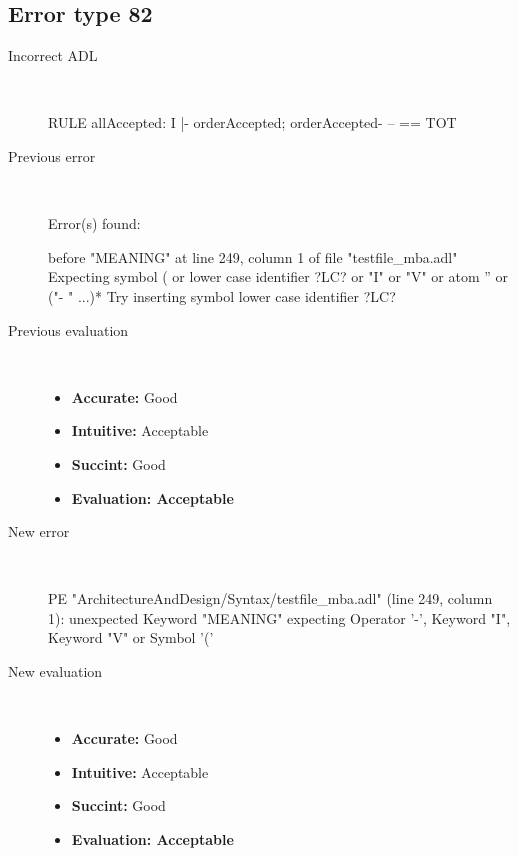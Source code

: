 \subsection{Error type 82}
  \begin{description}
  \item[Incorrect ADL]~\\
\begin{adl}
RULE allAccepted: I |- orderAccepted; orderAccepted- -- == TOT\end{adl}
  \item[Previous error]~\\
\begin{haskell}
Error(s) found:

before "MEANING" at line 249, column 1 of file "testfile_mba.adl"
Expecting symbol ( or lower case identifier ?LC? or "I" or "V" or atom '' or ("-
" ...)*
Try inserting symbol lower case identifier ?LC?
\end{haskell}
  \item[Previous evaluation]~\\
    \begin{itemize}
    \item \textbf{Accurate:} Good
    \item \textbf{Intuitive:} Acceptable
    \item \textbf{Succint:} Good
    \item \textbf{Evaluation: Acceptable}
    \end{itemize}
  \item[New error]~\\
\begin{haskell}
PE "ArchitectureAndDesign/Syntax/testfile_mba.adl" (line 249, column 1):
unexpected Keyword "MEANING"
expecting Operator '-', Keyword "I", Keyword "V" or Symbol '('\end{haskell}
  \item[New evaluation]~\\
    \begin{itemize}
    \item \textbf{Accurate:} Good
    \item \textbf{Intuitive:} Acceptable
    \item \textbf{Succint:} Good
    \item \textbf{Evaluation: Acceptable
}
    \end{itemize}
  \end{description}

\hrulefill

